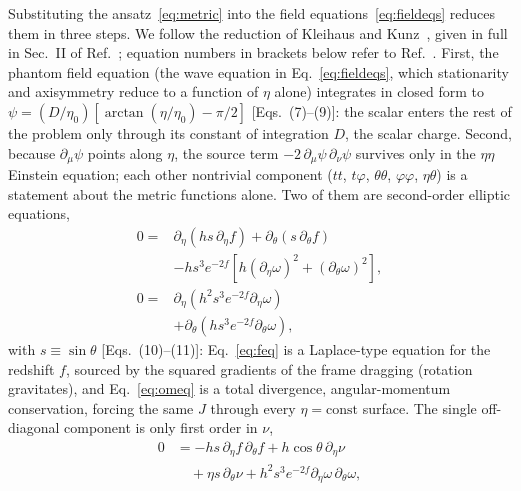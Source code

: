 \documentclass[twocolumn,floatfix,aps,prd,superscriptaddress,nofootinbib]{revtex4-2}
\begin{document}
Substituting the ansatz~\eqref{eq:metric} into the field equations~\eqref{eq:fieldeqs} reduces them in three steps. We follow the reduction of Kleihaus and Kunz~\cite{kleihaus_kunz2014}, given in full in Sec.~II of Ref.~\cite{chew2016}; equation numbers in brackets below refer to Ref.~\cite{chew2016}. First, the phantom field equation (the wave equation in Eq.~\eqref{eq:fieldeqs}, which stationarity and axisymmetry reduce to a function of $\eta$ alone) integrates in closed form to $\psi=(D/\eta_0)\left[\arctan(\eta/\eta_0)-\pi/2\right]$ [Eqs.~(7)--(9)]: the scalar enters the rest of the problem only through its constant of integration $D$, the scalar charge. Second, because $\partial_\mu\psi$ points along $\eta$, the source term $-2\,\partial_\mu\psi\,\partial_\nu\psi$ survives only in the $\eta\eta$ Einstein equation; each other nontrivial component ($tt$, $t\varphi$, $\theta\theta$, $\varphi\varphi$, $\eta\theta$) is a statement about the metric functions alone. Two of them are second-order elliptic equations,
\begin{align}
0={}&\partial_\eta\!\left(h s\,\partial_\eta f\right)+\partial_\theta\!\left(s\,\partial_\theta f\right)\nonumber\\
&-h s^3 e^{-2f}\!\left[h(\partial_\eta\omega)^2+(\partial_\theta\omega)^2\right],
\label{eq:feq}\\
0={}&\partial_\eta\!\left(h^2 s^3 e^{-2f}\partial_\eta\omega\right)\nonumber\\
&+\partial_\theta\!\left(h s^3 e^{-2f}\partial_\theta\omega\right),
\label{eq:omeq}
\end{align}
with $s\equiv\sin\theta$ [Eqs.~(10)--(11)]: Eq.~\eqref{eq:feq} is a Laplace-type equation for the redshift $f$, sourced by the squared gradients of the frame dragging (rotation gravitates), and Eq.~\eqref{eq:omeq} is a total divergence, angular-momentum conservation, forcing the same $J$ through every $\eta=\mathrm{const}$ surface. The single off-diagonal component is only first order in $\nu$,
\begin{equation}
\begin{split}
0&=-h s\,\partial_\eta f\,\partial_\theta f+h\cos\theta\,\partial_\eta\nu\\
&\quad+\eta s\,\partial_\theta\nu+h^2 s^3 e^{-2f}\partial_\eta\omega\,\partial_\theta\omega,
\end{split}
\label{eq:constraint}
\end{equation}
\end{document}
